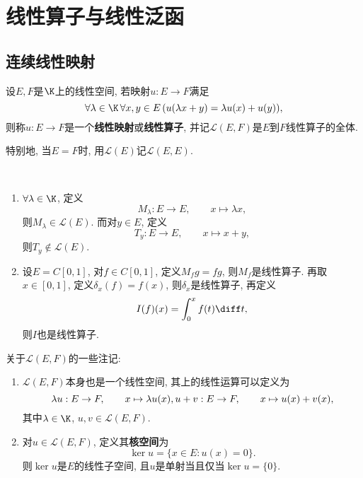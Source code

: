 
\chapter{线性算子与线性泛函}

\section{连续线性映射}

	\begin{Definition}
	设$ E, F $是$ \K $上的线性空间, 若映射$ u : E\to F $满足
	\[
	\forall \lambda\in\K\,\forall x,y\in E\,(u(\lambda x+y)=\lambda u(x)+u(y)),
	\]
	则称$ u : E\to F $是一个\textbf{线性映射}或\textbf{线性算子}, 并记$ \mathcal L(E,F) $是$ E $到$ F $线性算子的全体.
	\end{Definition}
	
	特别地, 当$ E=F $时, 用$ \mathcal L(E) $记$ \mathcal{L}(E,E) $.
	
	\begin{Example}~
	\begin{enumerate}[(1)]
	\item $ \forall \lambda\in\K $, 定义
	\[
	M_\lambda : E\to E,\qquad x\mapsto\lambda x,
	\]
	则$ M_\lambda\in\mathcal L(E) $. 而对$ y\in E $, 定义
	\[
	T_y : E\to E,\qquad x\mapsto x+y,
	\]
	则$ T_y\notin\mathcal L(E) $.
	
	\item 设$ E=C[0,1] $, 对$ f\in C[0,1] $, 定义$ M_fg=fg $, 则$ M_f $是线性算子. 再取$ x\in[0,1] $, 定义$ \delta_x(f)=f(x) $, 则$ \delta_x $是线性算子, 再定义
	\[
	I(f)(x)=\int_0^xf(t)\diff t,
	\]
	则$ I $也是线性算子.
	\end{enumerate}
	\end{Example}
	
	\begin{Remark}
	关于$ \mathcal L(E,F) $的一些注记:
	\begin{enumerate}[(1)]
	\item $ \mathcal L(E,F) $本身也是一个线性空间, 其上的线性运算可以定义为
	\[
	\lambda u : E\to F,\qquad x\mapsto\lambda u(x),\\
	u+v : E\to F,\qquad x\mapsto u(x)+v(x),
	\]
	其中$ \lambda\in\K $, $ u, v\in\mathcal L(E,F) $.
	
	\item 对$ u\in\mathcal L(E,F) $, 定义其\textbf{核空间}为
	\[
	\ker u=\{ x\in E : u(x)=0 \}.
	\]
	则$ \ker u $是$ E $的线性子空间, 且$ u $是单射当且仅当$ \ker u=\{0\} $.
	\end{enumerate}
	\end{Remark}
	
